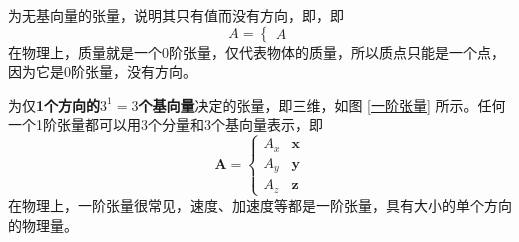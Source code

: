 \sssection[0阶张量]

为无基向量的张量，说明其只有值而没有方向，即，即
\begin{equation}
	A = \begin{cases}
		A
	\end{cases}
\end{equation}
在物理上，质量就是一个0阶张量，仅代表物体的质量，所以质点只能是一个点，因为它是0阶张量，没有方向。

\vspace*{1em}

\sssection[1阶张量]

为仅\textbf{1个方向的$3^1 = 3$个基向量}决定的张量，即三维，如图 \ref{一阶张量} 所示。任何一个1阶张量都可以用3个分量和3个基向量表示，即
\begin{equation}
	\bm{A} = 
	\begin{cases}
		A_x &\bm{x} \\
		A_y &\bm{y} \\
		A_z &\bm{z}
	\end{cases}
\end{equation}
在物理上，一阶张量很常见，速度、加速度等都是一阶张量，具有大小的单个方向的物理量。

